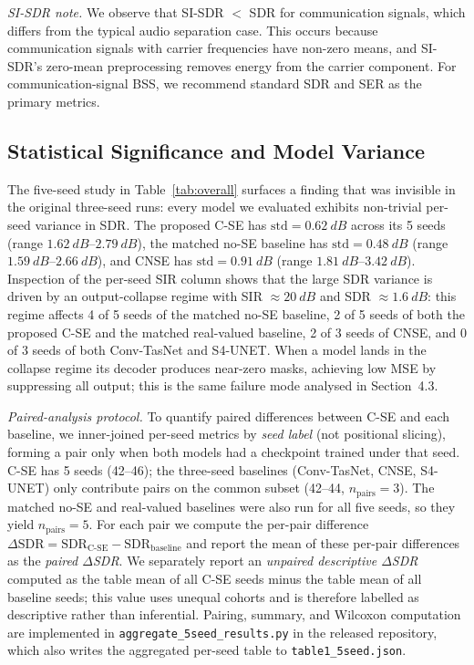 \documentclass[twocolumn,english]{svjour3}
\begin{document}
\emph{SI-SDR note.} We observe that SI-SDR $<$ SDR for communication signals, which differs from the typical audio separation case. This occurs because communication signals with carrier frequencies have non-zero means, and SI-SDR's zero-mean preprocessing removes energy from the carrier component. For communication-signal BSS, we recommend standard SDR and SER as the primary metrics.

\subsection{Statistical Significance and Model Variance}
\label{sec:significance}

\begin{sloppypar}
The five-seed study in Table~\ref{tab:overall} surfaces a finding that was invisible in the original three-seed runs: every model we evaluated exhibits non-trivial per-seed variance in SDR. The proposed C-SE has $\text{std}=\SI{0.62}{dB}$ across its 5 seeds (range $\SI{1.62}{dB}$--$\SI{2.79}{dB}$), the matched no-SE baseline has $\text{std}=\SI{0.48}{dB}$ (range $\SI{1.59}{dB}$--$\SI{2.66}{dB}$), and CNSE has $\text{std}=\SI{0.91}{dB}$ (range $\SI{1.81}{dB}$--$\SI{3.42}{dB}$). Inspection of the per-seed SIR column shows that the large SDR variance is driven by an output-collapse regime with SIR $\approx\SI{20}{dB}$ and SDR $\approx\SI{1.6}{dB}$: this regime affects 4 of 5 seeds of the matched no-SE baseline, 2 of 5 seeds of both the proposed C-SE and the matched real-valued baseline, 2 of 3 seeds of CNSE, and 0 of 3 seeds of both Conv-TasNet and S4-UNET. When a model lands in the collapse regime its decoder produces near-zero masks, achieving low MSE by suppressing all output; this is the same failure mode analysed in Section~4.3.
\end{sloppypar}

\begin{sloppypar}
\emph{Paired-analysis protocol.} To quantify paired differences between C-SE and each baseline, we inner-joined per-seed metrics by \emph{seed label} (not positional slicing), forming a pair only when both models had a checkpoint trained under that seed. C-SE has 5 seeds (42--46); the three-seed baselines (Conv-TasNet, CNSE, S4-UNET) only contribute pairs on the common subset (42--44, $n_{\text{pairs}}=3$). The matched no-SE and real-valued baselines were also run for all five seeds, so they yield $n_{\text{pairs}}=5$. For each pair we compute the per-pair difference $\Delta\text{SDR}=\text{SDR}_{\text{C-SE}}-\text{SDR}_{\text{baseline}}$ and report the mean of these per-pair differences as the \emph{paired $\Delta$SDR}. We separately report an \emph{unpaired descriptive $\Delta$SDR} computed as the table mean of all C-SE seeds minus the table mean of all baseline seeds; this value uses unequal cohorts and is therefore labelled as descriptive rather than inferential. Pairing, summary, and Wilcoxon computation are implemented in \texttt{aggregate\_5seed\_results.py} in the released repository, which also writes the aggregated per-seed table to \texttt{table1\_5seed.json}.
\end{sloppypar}
\end{document}
